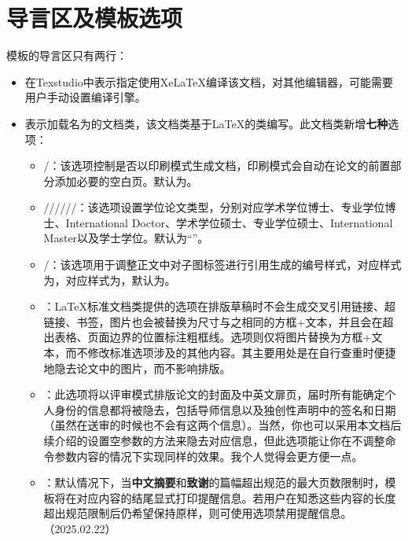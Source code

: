 \documentclass[print, doctor, vlined]{DissertUESTC}
\begin{document}
	\section{导言区及模板选项}

	模板的导言区只有两行：
	\begin{itemize}
		\item {}在Texstudio中表示指定使用XeLaTeX编译该文档，对其他编辑器，可能需要用户手动设置编译引擎。

		\item {}表示加载名为的文档类，该文档类基于LaTeX的类编写。此文档类新增\textbf{\color{DarkRed}七种}选项：

		\begin{itemize}
			\item {}/：该选项控制是否以印刷模式生成文档，印刷模式会自动在论文的前置部分添加必要的空白页。默认为。

			\item {}//////：该选项设置学位论文类型，分别对应学术学位博士、专业学位博士、International Doctor、学术学位硕士、专业学位硕士、International Master以及学士学位。默认为“”。
   
			\item {}/：该选项用于调整正文中对子图标签进行引用生成的编号样式，对应样式为，对应样式为，默认为。
   
			\item {}：LaTeX标准文档类提供的选项在排版草稿时不会生成交叉引用链接、超链接、书签，图片也会被替换为尺寸与之相同的方框+文本，并且会在超出表格、页面边界的位置标注粗框线。选项则仅将图片替换为方框+文本，而不修改标准选项涉及的其他内容。其主要用处是在自行查重时便捷地隐去论文中的图片，而不影响排版。
			
			\item {}：此选项将以评审模式排版论文的封面及中英文扉页，届时所有能确定个人身份的信息都将被隐去，包括导师信息以及独创性声明中的签名和日期（虽然在送审的时候也不会有这两个信息）。当然，你也可以采用本文档后续介绍的设置空参数的方法来隐去对应信息，但此选项能让你在不调整命令参数内容的情况下实现同样的效果。我个人觉得会更方便一点。
			
			\item {}：默认情况下，当\textbf{中文摘要}和\textbf{致谢}的篇幅超出规范的最大页数限制时，模板将在对应内容的结尾显式打印提醒信息。若用户在知悉这些内容的长度超出规范限制后仍希望保持原样，则可使用选项禁用提醒信息。（2025.02.22）
			

\end{itemize}
\end{itemize}
\end{document}
